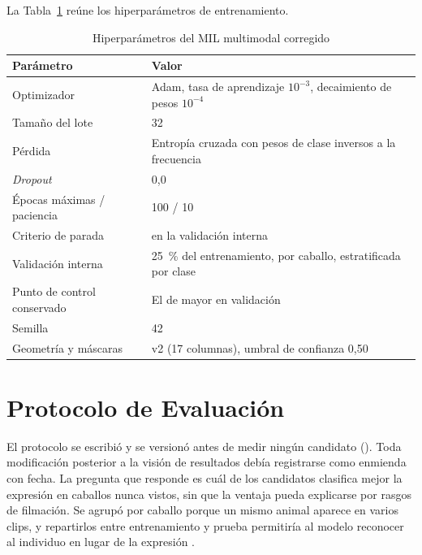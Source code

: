La Tabla~\ref{tab:c4-hiper} reúne los hiperparámetros de entrenamiento.

\begin{table}[H]
\caption{Hiperparámetros del MIL multimodal corregido}\label{tab:c4-hiper}
{\singlespacing
\begin{tabular}{@{}ll@{}}
\toprule
Parámetro & Valor \\
\midrule
Optimizador & Adam, tasa de aprendizaje $10^{-3}$, decaimiento de pesos $10^{-4}$ \\
Tamaño del lote & 32 \\
Pérdida & Entropía cruzada con pesos de clase inversos a la frecuencia \\
\textit{Dropout} & 0,0 \\
Épocas máximas / paciencia & 100 / 10 \\
Criterio de parada & \fmacro{} en la validación interna \\
Validación interna & 25~\% del entrenamiento, por caballo, estratificada por clase \\
Punto de control conservado & El de mayor \fmacro{} en validación \\
Semilla & 42 \\
Geometría y máscaras & v2 (17 columnas), umbral de confianza 0,50 \\
\bottomrule
\end{tabular}}
\end{table}

\section{Protocolo de Evaluación}
El protocolo se escribió y se versionó antes de medir ningún candidato (). Toda modificación posterior a la visión de resultados debía registrarse como enmienda con fecha. La pregunta que responde es cuál de los candidatos clasifica mejor la expresión en caballos nunca vistos, sin que la ventaja pueda explicarse por rasgos de filmación. Se agrupó por caballo porque un mismo animal aparece en varios clips, y repartirlos entre entrenamiento y prueba permitiría al modelo reconocer al individuo en lugar de la expresión \parencite{kapoor2023,varoquaux2018}.


